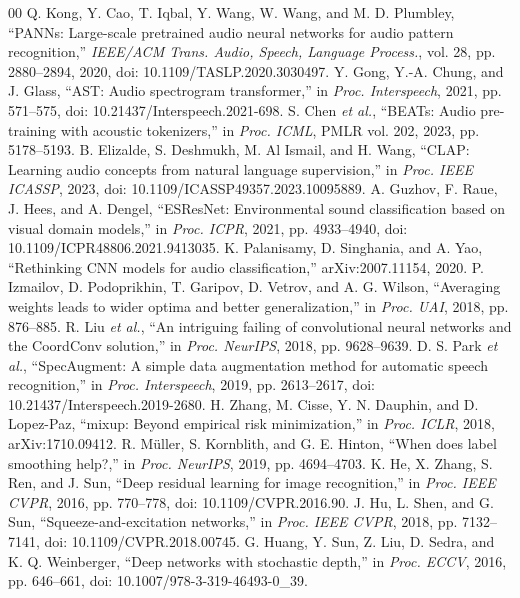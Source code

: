 \documentclass[conference]{IEEEtran}
\begin{document}
\begin{thebibliography}{00}
 Q. Kong, Y. Cao, T. Iqbal, Y. Wang, W. Wang, and M. D. Plumbley, ``PANNs: Large-scale pretrained audio neural networks for audio pattern recognition,'' \textit{IEEE/ACM Trans. Audio, Speech, Language Process.}, vol. 28, pp. 2880--2894, 2020, doi: 10.1109/TASLP.2020.3030497.
 Y. Gong, Y.-A. Chung, and J. Glass, ``AST: Audio spectrogram transformer,'' in \textit{Proc. Interspeech}, 2021, pp. 571--575, doi: 10.21437/Interspeech.2021-698.
 S. Chen \textit{et al.}, ``BEATs: Audio pre-training with acoustic tokenizers,'' in \textit{Proc. ICML}, PMLR vol. 202, 2023, pp. 5178--5193.
 B. Elizalde, S. Deshmukh, M. Al Ismail, and H. Wang, ``CLAP: Learning audio concepts from natural language supervision,'' in \textit{Proc. IEEE ICASSP}, 2023, doi: 10.1109/ICASSP49357.2023.10095889.
 A. Guzhov, F. Raue, J. Hees, and A. Dengel, ``ESResNet: Environmental sound classification based on visual domain models,'' in \textit{Proc. ICPR}, 2021, pp. 4933--4940, doi: 10.1109/ICPR48806.2021.9413035.
 K. Palanisamy, D. Singhania, and A. Yao, ``Rethinking CNN models for audio classification,'' arXiv:2007.11154, 2020.
 P. Izmailov, D. Podoprikhin, T. Garipov, D. Vetrov, and A. G. Wilson, ``Averaging weights leads to wider optima and better generalization,'' in \textit{Proc. UAI}, 2018, pp. 876--885.
 R. Liu \textit{et al.}, ``An intriguing failing of convolutional neural networks and the CoordConv solution,'' in \textit{Proc. NeurIPS}, 2018, pp. 9628--9639.
 D. S. Park \textit{et al.}, ``SpecAugment: A simple data augmentation method for automatic speech recognition,'' in \textit{Proc. Interspeech}, 2019, pp. 2613--2617, doi: 10.21437/Interspeech.2019-2680.
 H. Zhang, M. Cisse, Y. N. Dauphin, and D. Lopez-Paz, ``mixup: Beyond empirical risk minimization,'' in \textit{Proc. ICLR}, 2018, arXiv:1710.09412.
 R. M\"uller, S. Kornblith, and G. E. Hinton, ``When does label smoothing help?,'' in \textit{Proc. NeurIPS}, 2019, pp. 4694--4703.
 K. He, X. Zhang, S. Ren, and J. Sun, ``Deep residual learning for image recognition,'' in \textit{Proc. IEEE CVPR}, 2016, pp. 770--778, doi: 10.1109/CVPR.2016.90.
 J. Hu, L. Shen, and G. Sun, ``Squeeze-and-excitation networks,'' in \textit{Proc. IEEE CVPR}, 2018, pp. 7132--7141, doi: 10.1109/CVPR.2018.00745.
 G. Huang, Y. Sun, Z. Liu, D. Sedra, and K. Q. Weinberger, ``Deep networks with stochastic depth,'' in \textit{Proc. ECCV}, 2016, pp. 646--661, doi: 10.1007/978-3-319-46493-0\_39.

\end{thebibliography}
\end{document}
